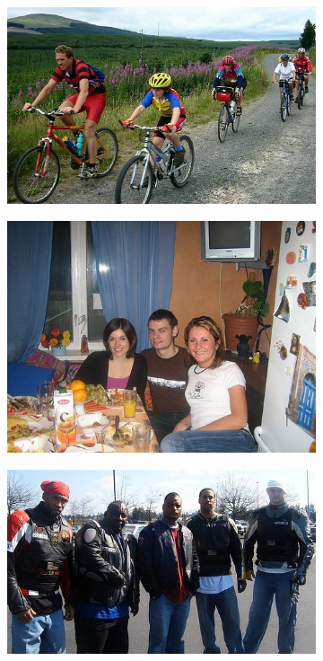 \begin{figure}[h]
\centering
\begin{subfigure}{.25\textwidth}
  \includegraphics[width=1.\linewidth,height=0.618\linewidth]{figures/pascal_dataset/image-1.jpg}
\end{subfigure}%
\begin{subfigure}{.25\textwidth}
  \includegraphics[width=1.\linewidth,height=0.618\linewidth]{figures/pascal_dataset/image-2.jpg}
\end{subfigure}%
\begin{subfigure}{.25\textwidth}
  \includegraphics[width=1.\linewidth,height=0.618\linewidth]{figures/pascal_dataset/image-3.jpg}

\end{subfigure}
\end{figure}
